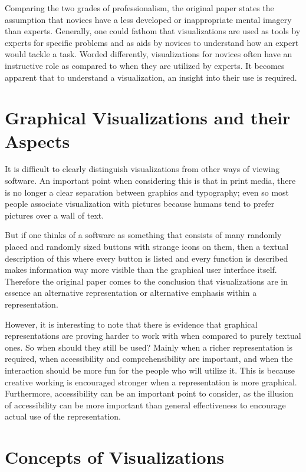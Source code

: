 \documentclass[11pt, a4paper, ngerman, twoside]{article}
\theoremstyle{plain}\newtheorem{Lemma}{Lemma}
\theoremstyle{plain}\newtheorem{Satz}[Lemma]{Satz}
\theoremstyle{definition}\newtheorem{Definition}[Lemma]{Definition}
\theoremstyle{definition}\newtheorem*{Beispiel}{Beispiel}
\theoremstyle{remark}\newtheorem*{Bemerkung}{Bemerkung}
\begin{document}
Comparing the two grades of professionalism, the original paper states the assumption that novices have a less developed or inappropriate mental imagery than experts. Generally, one could fathom that visualizations are used as tools by experts for specific problems and as aids by novices to understand how an expert would tackle a task. Worded differently, visualizations for novices often have an instructive role as compared to when they are utilized by experts. It becomes apparent that to understand a visualization, an insight into their use is required.

\section{Graphical Visualizations and their Aspects}
\label{graphical}

It is difficult to clearly distinguish visualizations from other ways of viewing software. An important point when considering this is that in print media, there is no longer a clear separation between graphics and typography; even so most people associate visualization with pictures because humans tend to prefer pictures over a wall of text.

But if one thinks of a software as something that consists of many randomly placed and randomly sized buttons with strange icons on them, then a textual description of this where every button is listed and every function is described makes information way more visible than the graphical user interface itself. Therefore the original paper comes to the conclusion that visualizations are in essence an alternative representation or alternative emphasis within a representation.

However, it is interesting to note that there is evidence that graphical representations are proving harder to work with when compared to purely textual ones. So when should they still be used? Mainly when a richer representation is required, when accessibility and comprehensibility are important, and when the interaction should be more fun for the people who will utilize it. This is because creative working is encouraged stronger when a representation is more graphical. Furthermore, accessibility can be an important point to consider, as the illusion of accessibility can be more important than general effectiveness to encourage actual use of the representation.

\section{Concepts of Visualizations}
\end{document}
